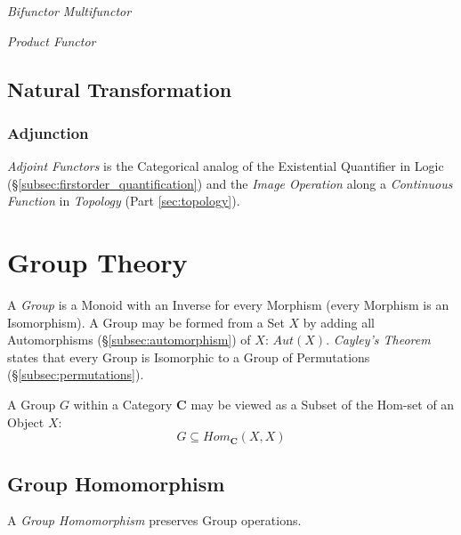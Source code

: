 \documentclass{article}
\begin{document}
\emph{Bifunctor} \emph{Multifunctor}

\emph{Product Functor}

\subsection{Natural Transformation}\label{subsec:natural_transformation}

\subsubsection{Adjunction}\label{subsec:adjunction}

\emph{Adjoint Functors} is the Categorical analog of the Existential
Quantifier in Logic (\S\ref{subsec:firstorder_quantification}) and the
\emph{Image Operation} along a \emph{Continuous Function} in
\emph{Topology} (Part \ref{sec:topology}).

\section{Group Theory}

A \emph{Group} is a Monoid with an Inverse for every Morphism (every
Morphism is an Isomorphism). A Group may be formed from a Set $X$ by
adding all Automorphisms (\S\ref{subsec:automorphism}) of $X$:
$Aut(X)$. \emph{Cayley's Theorem} states that every Group is
Isomorphic to a Group of Permutations (\S\ref{subsec:permutations}).

A Group $G$ within a Category $\mathbf{C}$ may be viewed as a Subset
of the Hom-set of an Object $X$:
\[
    G \subseteq Hom_{\mathbf{C}}(X,X)
\]

\subsection{Group Homomorphism}\label{subsec:group_homomorphism}

A \emph{Group Homomorphism} preserves Group operations.
\end{document}
